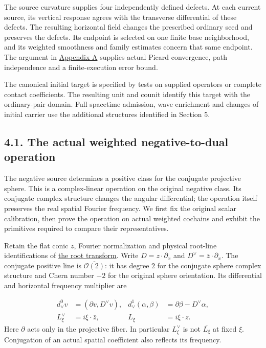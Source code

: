 \documentclass[
  english,
  11pt,
  reqno]{amsart}
\begin{document}
The source curvature supplies four independently defined defects. At
each current source, its vertical response agrees with the transverse
differential of these defects. The resulting horizontal field changes
the prescribed ordinary seed and preserves the defects. Its endpoint is
selected on one finite base neighborhood, and its weighted smoothness
and family estimates concern that same endpoint. The argument in
\hyperref[sec:online-current-flat-input-transport]{Appendix A} supplies
actual Picard convergence, path independence and a finite-execution
error bound.

The canonical initial target is specified by tests on supplied operators
or complete contact coefficients. The resulting unit and counit identify
this target with the ordinary-pair domain. Full spacetime admission,
wave enrichment and changes of initial carrier use the additional
structures identified in Section 5.

\subsection{4.1. The actual weighted negative-to-dual
operation}\label{the-actual-weighted-negative-to-dual-operation}\label{sec:online-actual-negative-dual}

The negative source determines a positive class for the conjugate
projective sphere. This is a complex-linear operation on the original
negative class. Its conjugate complex structure changes the angular
differential; the operation itself preserves the real spatial Fourier
frequency. We first fix the original scalar calibration, then prove the
operation on actual weighted cochains and exhibit the primitives
required to compare their representatives.

Retain the flat conic \(z\), Fourier normalization and physical
root-line identifications of
\hyperref[sec:online-root-calibration-and-seeds]{the root transform}.
Write \(D=z\cdot\partial_x\) and \(D^\vee=\bar z\cdot\partial_x\). The
conjugate positive line is \(\overline{\mathcal O(2)}\): it has degree
\(2\) for the conjugate sphere complex structure and Chern number \(-2\)
for the original sphere orientation. Its differential and horizontal
frequency multiplier are

\label{eq:online-dual-positive-differential} \[
\begin{aligned}
d_\vee^0v&=(\partial v,D^\vee v),&
d_\vee^1(\alpha,\beta)&=\partial\beta-D^\vee\alpha,\\
L_\xi^\vee&=i\xi\cdot\bar z,&
L_\xi&=i\xi\cdot z .
\end{aligned}
\] Here \(\partial\) acts only in the projective fiber. In particular
\(L_\xi^\vee\) is not \(\overline{L_\xi}\) at fixed \(\xi\). Conjugation
of an actual spatial coefficient also reflects its frequency.
\end{document}
